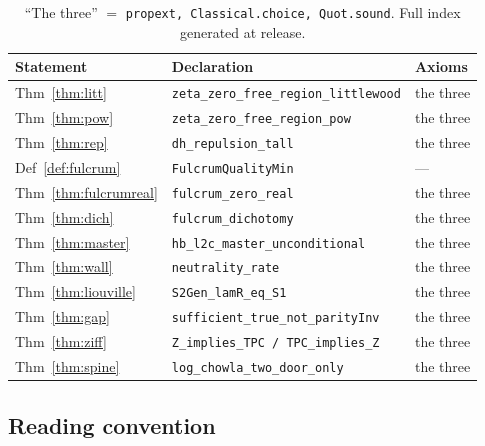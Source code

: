 \documentclass{CUP-JNL-FMP}
\newcommand{\leaninline}[1]{{\small\texttt{#1}}}
\theoremstyle{remark}
\begin{document}
\begin{table}[h]
\centering\small
\begin{tabular}{lll}
\toprule
Statement & Declaration & Axioms \\
\midrule
Thm~\ref{thm:litt} & \leaninline{zeta\_zero\_free\_region\_littlewood} & the three \\
Thm~\ref{thm:pow} & \leaninline{zeta\_zero\_free\_region\_pow} & the three \\
Thm~\ref{thm:rep} & \leaninline{dh\_repulsion\_tall} & the three \\
Def~\ref{def:fulcrum} & \leaninline{FulcrumQualityMin} & --- \\
Thm~\ref{thm:fulcrumreal} & \leaninline{fulcrum\_zero\_real} & the three \\
Thm~\ref{thm:dich} & \leaninline{fulcrum\_dichotomy} & the three \\
Thm~\ref{thm:master} & \leaninline{hb\_l2c\_master\_unconditional} & the three \\
Thm~\ref{thm:wall} & \leaninline{neutrality\_rate} & the three \\
Thm~\ref{thm:liouville} & \leaninline{S2Gen\_lamR\_eq\_S1} & the three \\
Thm~\ref{thm:gap} & \leaninline{sufficient\_true\_not\_parityInv} & the three \\
Thm~\ref{thm:ziff} & \leaninline{Z\_implies\_TPC / TPC\_implies\_Z} & the three \\
Thm~\ref{thm:spine} & \leaninline{log\_chowla\_two\_door\_only} & the three \\
\bottomrule
\end{tabular}
\caption{``The three'' $=$ \leaninline{propext, Classical.choice,
Quot.sound}. Full index generated at release.}
\end{table}

\subsection{Reading convention}\label{app:conv}
\end{document}
